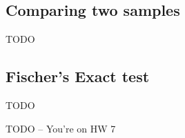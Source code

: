 \documentclass{article}
\begin{document}
\subsection{Comparing two samples}
TODO
\subsection{Fischer's Exact test}
TODO

TODO -- You're on HW 7
\end{document}
